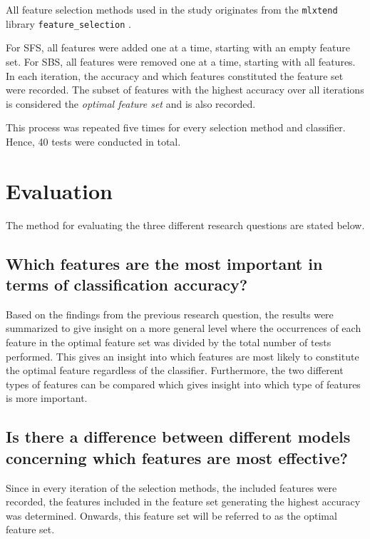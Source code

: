 \documentclass{kththesis}
\begin{document}
All feature selection methods used in the study originates from the \verb|mlxtend| library \verb|feature_selection| \parencite{raschkas_2018_mlxtend}.

For SFS, all features were added one at a time, starting with an empty feature set. For SBS, all features were removed one at a time, starting with all features. In each iteration, the accuracy and which features constituted the feature set were recorded. The subset of features with the highest accuracy over all iterations is considered the \emph{optimal feature set} and is also recorded.

This process was repeated five times for every selection method and classifier. Hence, 40 tests were conducted in total.


\section{Evaluation}

The method for evaluating the three different research questions are stated below.

\subsection{Which features are the most important in terms of classification accuracy?}
Based on the findings from the previous research question, the results were summarized to give insight on a more general level where the occurrences of each feature in the optimal feature set was divided by the total number of tests performed. This gives an insight into which features are most likely to constitute the optimal feature regardless of the classifier. Furthermore, the two different types of features can be compared which gives insight into which type of features is more important.

\subsection{Is there a difference between different models concerning which features are most effective?}
Since in every iteration of the selection methods, the included features were recorded, the features included in the feature set generating the highest accuracy was determined. Onwards, this feature set will be referred to as the optimal feature set. 
\end{document}
